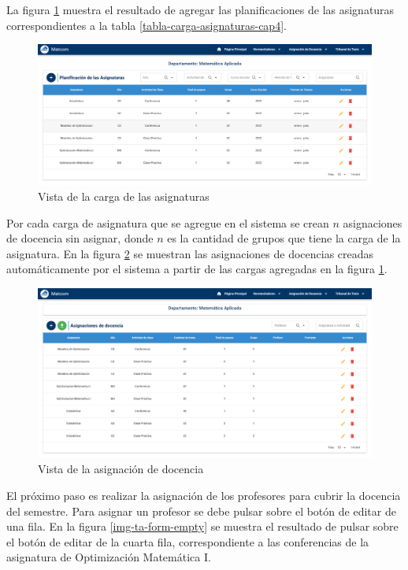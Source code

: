 La figura \ref{img-pd-result} muestra el resultado de agregar las planificaciones de las asignaturas 
correspondientes a la tabla \ref{tabla-carga-asignaturas-cap4}. 


\begin{figure}[H]
    \includegraphics[scale=0.3]{Graphics/Implementation/Docencia/PD-result.png}
    \caption{Vista de la carga de las asignaturas}
    \label{img-pd-result}
\end{figure}

Por cada carga de asignatura que se agregue en el sistema se crean $n$ asignaciones 
de docencia sin asignar, donde $n$ es la cantidad de grupos que tiene la carga de la asignatura. En 
la figura \ref{img-ta-unassing} se muestran las asignaciones de docencias creadas automáticamente por el sistema 
a partir de las cargas agregadas en la figura \ref{img-pd-result}.

\begin{figure}[H]
    \includegraphics[scale=0.3]{Graphics/Implementation/Docencia/AD-unassing.png}
    \caption{Vista de la asignación de docencia}
    \label{img-ta-unassing}
\end{figure}


El próximo paso es realizar la asignación de los profesores para cubrir 
la docencia del semestre. Para asignar un profesor se debe 
pulsar sobre el botón de editar de una fila. En la figura \ref{img-ta-form-empty} se muestra el resultado 
de pulsar sobre el botón de editar de la cuarta fila, correspondiente a las conferencias
de la asignatura de Optimización Matemática I. 


